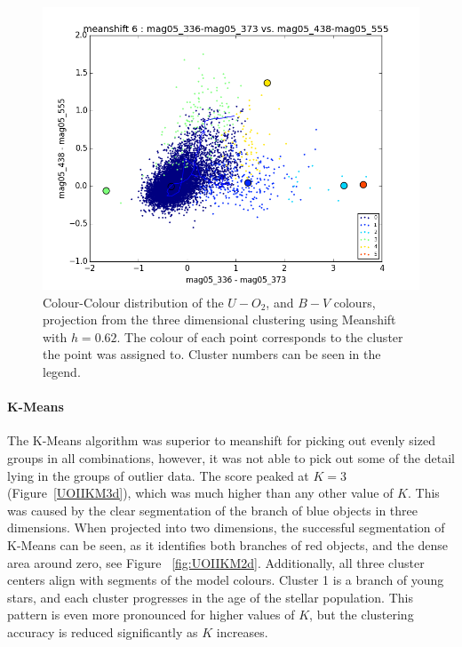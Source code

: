 \begin{figure}
\centering
\includegraphics[width=\linewidth]{figs/successful/meanshift_base_color_6cl_mag05_336-mag05_373vsmag05_438-mag05_555}
\caption{Colour-Colour distribution of the $U-O_{2}$, and $B - V$ colours, projection from the three dimensional clustering using Meanshift with $h=0.62$. The colour of each point corresponds to the cluster the point was assigned to. Cluster numbers can be seen in the legend.}
\label{fig:UOII3dMS6}
\end{figure}

\paragraph{K-Means}
The K-Means algorithm was superior to meanshift for picking out evenly sized groups in all combinations, however, it was not able to pick out some of the detail lying in the groups of outlier data. 
The score peaked at $K=3$ (Figure~\ref{UOIIKM3d}), which was much higher than any other value of $K$.
This was caused by the clear segmentation of the branch of blue objects in three dimensions.
When projected into two dimensions, the successful segmentation of K-Means can be seen, as it identifies both branches of red objects, and the dense area around zero, see Figure ~\ref{fig:UOIIKM2d}.
Additionally, all three cluster centers align with segments of the model colours.
Cluster 1 is a branch of young stars, and each cluster progresses in the age of the stellar population.
This pattern is even more pronounced for higher values of $K$, but the clustering accuracy is reduced significantly as $K$ increases.

